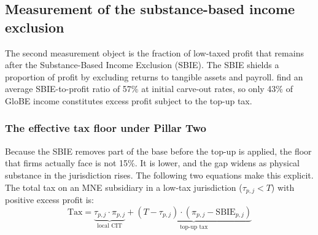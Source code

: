 \documentclass[11pt,a4paper]{article}
\begin{document}
\subsection{Measurement of the substance-based income exclusion}\label{sec:SBIE}

The second measurement object is the fraction of low-taxed profit that remains after the Substance-Based Income Exclusion (SBIE). The SBIE shields a proportion of profit by excluding returns to tangible assets and payroll. \citet{devereux2023} find an average SBIE-to-profit ratio of 57\% at initial carve-out rates, so only 43\% of GloBE income constitutes excess profit subject to the top-up tax.

\subsubsection{The effective tax floor under Pillar Two}\label{sec:floor}

Because the SBIE removes part of the base before the top-up is applied, the floor that firms actually face is not 15\%. It is lower, and the gap widens as physical substance in the jurisdiction rises. The following two equations make this explicit. The total tax on an MNE subsidiary in a low-tax jurisdiction ($\tau_{p,j} < T$) with positive excess profit is:
\begin{equation}\label{eq:total_tax}
\text{Tax} = \underbrace{\tau_{p,j} \cdot \pi_{p,j}}_{\text{local CIT}} + \underbrace{(T - \tau_{p,j}) \cdot (\pi_{p,j} - \text{SBIE}_{p,j})}_{\text{top-up tax}}
\end{equation}
\end{document}
